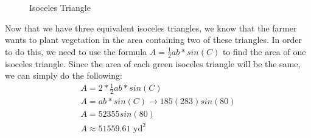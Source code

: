\documentclass{article}
\begin{document}
\begin{center}
\begin{figure}[!htbp]
    \caption{Isoceles Triangle}
  \end{figure}
  Now that we have three equivalent isoceles triangles, we know that the farmer wants to plant vegetation in the area containing two of these triangles. In order to do this, we need to use the formula $ A = \frac{1}{2}ab*sin(C)$ to find the area of one isoceles triangle. Since the area of each green isoceles triangle will be the same, we can simply do the following:
  \begin{align}
    A = 2*\frac{1}{2} ab*sin(C) \\
    A = ab*sin(C) \rightarrow 185 (283) sin(80) \\
    A = 52355 sin(80) \\
    A \approx 51559.61 \text{ yd}^2
  \end{align}
\end{center}
\end{document}
